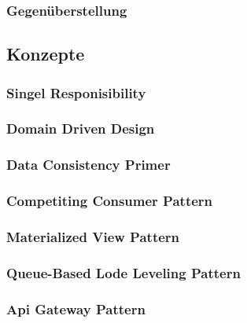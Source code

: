 	\subsubsection{Gegenüberstellung}
	
\subsection{Konzepte}
	\subsubsection{Singel Responisibility}
	\subsubsection{Domain Driven Design}
	\subsubsection{Data Consistency Primer}
	\subsubsection{Competiting Consumer Pattern}
	\subsubsection{Materialized View Pattern}
	\subsubsection{Queue-Based Lode Leveling Pattern}
	\subsubsection{Api Gateway Pattern}
